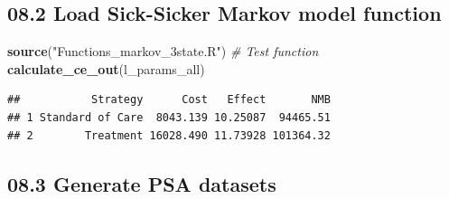 \documentclass[
]{article}
\newenvironment{Shaded}{\begin{snugshade}}{\end{snugshade}}
\newcommand{\CommentTok}[1]{\textcolor[rgb]{0.56,0.35,0.01}{\textit{#1}}}
\newcommand{\KeywordTok}[1]{\textcolor[rgb]{0.13,0.29,0.53}{\textbf{#1}}}
\newcommand{\NormalTok}[1]{#1}
\newcommand{\StringTok}[1]{\textcolor[rgb]{0.31,0.60,0.02}{#1}}
\begin{document}
\hypertarget{load-sick-sicker-markov-model-function}{%
\subsection{08.2 Load Sick-Sicker Markov model
function}\label{load-sick-sicker-markov-model-function}}

\begin{Shaded}
\begin{Highlighting}[]
\KeywordTok{source}\NormalTok{(}\StringTok{"Functions_markov_3state.R"}\NormalTok{)}
\CommentTok{# Test function}
\KeywordTok{calculate_ce_out}\NormalTok{(l_params_all)}
\end{Highlighting}
\end{Shaded}

\begin{verbatim}
##           Strategy      Cost   Effect       NMB
## 1 Standard of Care  8043.139 10.25087  94465.51
## 2        Treatment 16028.490 11.73928 101364.32
\end{verbatim}

\hypertarget{generate-psa-datasets}{%
\subsection{08.3 Generate PSA datasets}\label{generate-psa-datasets}}
\end{document}
